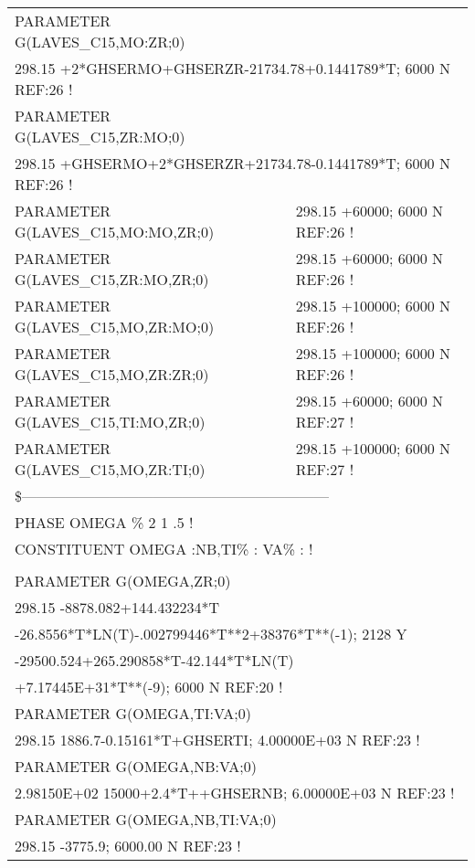 \begin{longtable}[H]{ l l l }
	PARAMETER G(LAVES\_C15,MO:ZR;0) & & \\
	\multicolumn{3}{l}{298.15 +2*GHSERMO+GHSERZR-21734.78+0.1441789*T; 6000 N REF:26 !}\\
	PARAMETER G(LAVES\_C15,ZR:MO;0) & &\\
	\multicolumn{3}{l}{298.15 +GHSERMO+2*GHSERZR+21734.78-0.1441789*T; 6000 N REF:26 !}\\
	PARAMETER G(LAVES\_C15,MO:MO,ZR;0) & \multicolumn{2}{l}{298.15 +60000; 6000 N REF:26 !}\\
	PARAMETER G(LAVES\_C15,ZR:MO,ZR;0) & \multicolumn{2}{l}{298.15 +60000; 6000 N REF:26 !}\\
	PARAMETER G(LAVES\_C15,MO,ZR:MO;0) & \multicolumn{2}{l}{298.15 +100000; 6000 N REF:26 !}\\
	PARAMETER G(LAVES\_C15,MO,ZR:ZR;0) & \multicolumn{2}{l}{298.15 +100000; 6000 N REF:26 !}\\
	PARAMETER G(LAVES\_C15,TI:MO,ZR;0) & \multicolumn{2}{l}{298.15 +60000; 6000 N REF:27 !}\\
	PARAMETER G(LAVES\_C15,MO,ZR:TI;0) & \multicolumn{2}{l}{298.15 +100000; 6000 N REF:27 !}\\
	\multicolumn{3}{l}{\$---------------------------------------------------------------}\\
	\multicolumn{3}{l}{PHASE OMEGA  \%  2 1   .5 !}\\
	\multicolumn{3}{l}{CONSTITUENT OMEGA  :NB,TI\% : VA\% :  !}\\
	& & \\
	PARAMETER G(OMEGA,ZR;0) & & \\
	\multicolumn{3}{l}{298.15 -8878.082+144.432234*T}\\
	\multicolumn{3}{l}{-26.8556*T*LN(T)-.002799446*T**2+38376*T**(-1); 2128 Y}\\
	\multicolumn{3}{l}{-29500.524+265.290858*T-42.144*T*LN(T)}\\
	\multicolumn{3}{l}{+7.17445E+31*T**(-9); 6000 N REF:20 !}\\
	PARAMETER G(OMEGA,TI:VA;0) & & \\
	\multicolumn{3}{l}{298.15 1886.7-0.15161*T+GHSERTI; 4.00000E+03  N REF:23 !}\\
	PARAMETER G(OMEGA,NB:VA;0) & &\\
	\multicolumn{3}{l}{2.98150E+02  15000+2.4*T++GHSERNB; 6.00000E+03   N REF:23 !}\\
	PARAMETER G(OMEGA,NB,TI:VA;0) & &\\
	\multicolumn{3}{l}{298.15 -3775.9; 6000.00 N REF:23   !}\\

\end{longtable}
